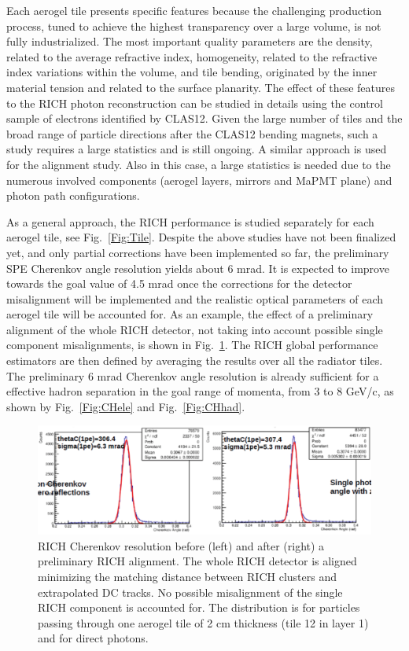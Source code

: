 \documentclass[5p,times,twocolumn]{elsarticle}
\def\MaPMT{MaPMT }
\begin{document}
Each aerogel tile presents specific features because the challenging production process, tuned to achieve the highest transparency over a large volume, is not fully industrialized. The most important quality parameters are the density, related to the average refractive index, homogeneity, related to the refractive index variations within the volume, and tile bending, originated by the inner material tension and related to the surface planarity. The effect of these features to the RICH photon reconstruction can be studied in details using the control sample of electrons identified by CLAS12. Given the large number of tiles and the broad range of particle directions after the CLAS12 bending magnets, such a study requires a large statistics and is still ongoing. A similar approach is used for the alignment study. Also in this case, a large statistics is needed due to the numerous involved components (aerogel layers, mirrors and \MaPMT plane) and photon path configurations. 

As a general approach, the RICH performance is studied separately for each aerogel tile, see Fig.~\ref{Fig:Tile}. Despite the above studies have not been finalized yet, and only partial corrections have been implemented so far, the preliminary SPE Cherenkov angle resolution yields about 6 mrad. It is expected to improve towards the goal value of 4.5 mrad once the corrections for the detector misalignment will be implemented and the realistic optical parameters of each aerogel tile will be accounted for. As an example, the effect of a preliminary alignment of the whole RICH detector, not taking into account possible single component misalignments, is shown in Fig.~\ref{Fig:Align}. The RICH global performance estimators are then defined by averaging the results over all the radiator tiles. The preliminary 6 mrad Cherenkov angle resolution is already sufficient for a effective hadron separation in the goal range of momenta, from 3 to 8 GeV/c, as shown by Fig.~\ref{Fig:CHele} and Fig.~\ref{Fig:CHhad}.


\begin{figure}[t]
\begin{center}
\includegraphics[width=1.0\columnwidth]{Reso_align.png}
\end{center}
\caption{RICH Cherenkov resolution before (left) and after (right) a preliminary RICH alignment. The whole RICH detector is aligned minimizing the matching distance between RICH clusters and extrapolated DC tracks. No possible misalignment of the single RICH component is accounted for. The distribution is for particles passing through one aerogel tile of 2 cm thickness (tile 12
in layer 1) and for direct photons.}
\label{Fig:Align}
\end{figure}
\end{document}
